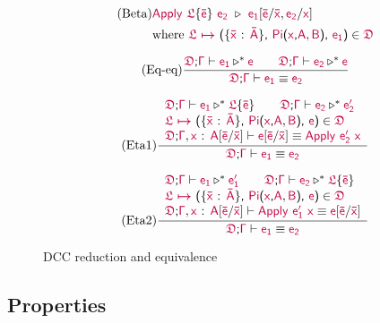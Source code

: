 \begin{figure}
\renewcommand{\arraystretch}{1.3}

	\begin{align*}
		\tag{Beta}
		& \target{Apply\ } \target{\flabel}\{\target{\bar{e}}\}\ \target{e_2}\ \triangleright\  
		\target{e_1}[\target{\bar{e}} \slash \target{\bar{x}} , \target{e_2} \slash \target{x}] \\
		& \text{where } \itemdef{\target{\flabel}}{\itemtype{\bar{x}}{\bar{A}}}{\targetpi{x}{A}{B}}{\target{e_1}} \in \target{\fdef}
	\end{align*}

	\begin{equation}
		\tag{Eq-eq}
		\frac
			{\target{\fdef} \textsf{;} \target{\Gamma} \vdash \target{e_1} \triangleright^* \target{e} \qquad 
			 \target{\fdef} \textsf{;} \target{\Gamma} \vdash \target{e_2} \triangleright^* \target{e}}
			{\target{\fdef} \textsf{;} \target{\Gamma} \vdash \target{e_1} \equiv \target{e_2}}
	\end{equation}

	\begin{equation}
		\tag{Eta1}
		\frac
			{\begin{array}{l}
			  \target{\fdef} \textsf{;} \target{\Gamma} \vdash \target{e_1} \triangleright^* \targetlab{\flabel}{\bar{e}} \qquad
	          \target{\fdef} \textsf{;} \target{\Gamma} \vdash \target{e_2} \triangleright^* \target{e_2'} \\
	          \itemdef{\target{\flabel}}{\itemtype{\bar{x}}{\bar{A}}}{\targetpi{x}{A}{B}}{\target{e}} \in \target{\fdef} \\
	          \target{\fdef} \textsf{;} \target{\Gamma}, \itemtype{x}{A} \targetsub{\bar{e}}{\bar{x}} \vdash 
	          \target{e}\targetsub{\bar{e}}{\bar{x}} \equiv \targetapp{e_2'}{x}
        	\end{array}}
			{\target{\fdef} \textsf{;} \target{\Gamma} \vdash \target{e_1} \equiv \target{e_2}}
	\end{equation}

	\begin{equation}
		\tag{Eta2}
		\frac
			{\begin{array}{l}
			  \target{\fdef} \textsf{;} \target{\Gamma} \vdash \target{e_1} \triangleright^* \target{e_1'} \qquad
	          \target{\fdef} \textsf{;} \target{\Gamma} \vdash \target{e_2} \triangleright^* \targetlab{\flabel}{\bar{e}} \\
	          \itemdef{\target{\flabel}}{\itemtype{\bar{x}}{\bar{A}}}{\targetpi{x}{A}{B}}{\target{e}} \in \target{\fdef} \\
	          \target{\fdef} \textsf{;} \target{\Gamma}, \itemtype{x}{A} \targetsub{\bar{e}}{\bar{x}} \vdash 
	          \targetapp{e_1'}{x} \equiv \target{e}\targetsub{\bar{e}}{\bar{x}}
        	\end{array}}
			{\target{\fdef} \textsf{;} \target{\Gamma} \vdash \target{e_1} \equiv \target{e_2}}
	\end{equation}

	\caption{DCC reduction and equivalence}
    \label{fig:dcc equivalence}
\end{figure}

\subsection{Properties}

